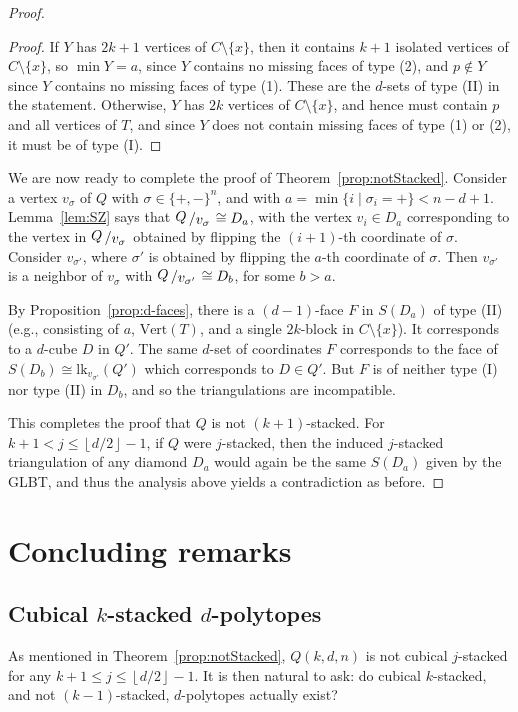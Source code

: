 \documentclass[a4paper,leqno]{article}
\theoremstyle{definition}
\newcommand{\lk}{\mathrm{lk}}
\newcommand{\vertices}{\mathrm{Vert}}
\newcommand{\dhalf}[1]{\left\lfloor #1/2\right\rfloor}
\newcommand{\vfig}[2]{{\raisebox{.1em}{$#1$}\left/\raisebox{-.1em}{$#2$}\right.}}
\begin{document}
\begin{proof}
\begin{proof}
If $Y$ has $2k+1$ vertices of $C\setminus \{x\}$, then it contains $k+1$ isolated vertices of $C\setminus \{x\}$, so $\min Y=a$, since $Y$ contains no missing faces of type (2), and $p\notin Y$ since $Y$ contains no missing faces of type (1). These are the $d$-sets of type (II) in the statement. Otherwise, $Y$ has $2k$ vertices of $C\setminus \{x\}$, and hence must contain $p$ and all vertices of $T$, and since $Y$ does not contain missing faces of type (1) or (2), it must be of type (I).
\end{proof}

We are now ready to complete the proof of Theorem~\ref{prop:notStacked}.
Consider a vertex $v_{\sigma}$ of $Q$ with $\sigma\in\{+,-\}^n$, and with $a=\min\{i\mid \sigma_i=+\}< n-d+1$.
Lemma~\ref{lem:SZ} says that $\vfig{Q}{v_{\sigma}}\cong D_a$, with the vertex $v_i\in D_a$ corresponding to the vertex in $\vfig{Q}{v_{\sigma}}$ obtained by flipping the $(i+1)$-th coordinate of $\sigma$. Consider $v_{\sigma'}$, where $\sigma'$ is obtained by flipping the $a$-th coordinate of $\sigma$. Then $v_{\sigma'}$ is a neighbor of $v_{\sigma}$ with $\vfig{Q}{v_{\sigma'}}\cong D_b$, for some $b>a$.

By Proposition~\ref{prop:d-faces}, there is a $(d-1)$-face $F$ in $S(D_a)$ of type (II) (e.g., consisting of $a$, $\vertices(T)$, and a single $2k$-block in $C \setminus \{x\}$). It corresponds to a $d$-cube $D$ in $Q'$. The same $d$-set of coordinates $F$ corresponds to the face of $S(D_b)\cong\lk_{v_{\sigma'}}(Q')$ which corresponds to $D\in Q'$. But $F$ is of neither type (I) nor type (II) in $D_b$, and so the triangulations are incompatible.

This completes the proof that $Q$ is not $(k+1)$-stacked.
For $k+1<j\le \dhalf{d}-1$, if $Q$ were $j$-stacked, then the induced $j$-stacked triangulation of any diamond $D_a$ would again be the same $S(D_a)$ given by the GLBT, and thus the analysis above yields a contradiction as before.
\end{proof}


\section{Concluding remarks}\label{sec:concluding_remarks}

\subsection{Cubical $k$-stacked $d$-polytopes}
As mentioned in Theorem~\ref{prop:notStacked}, $Q(k,d,n)$ is not cubical $j$-stacked for any $k+1\leq j\leq \dhalf{d}-1$. It is then natural to ask:
do cubical $k$-stacked, and not $(k-1)$-stacked, $d$-polytopes actually exist?
\end{document}
